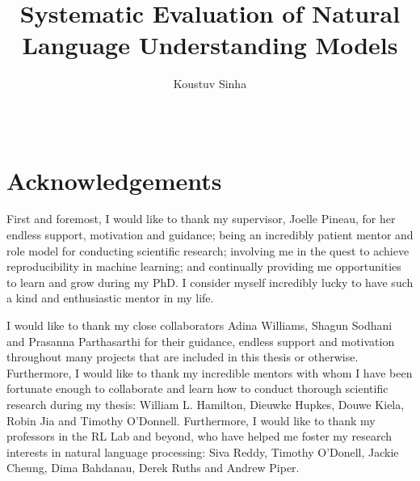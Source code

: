 \documentclass[letterpaper, 12pt]{report}
\begin{document}

\title{Systematic Evaluation of Natural Language Understanding Models}
\author{Koustuv Sinha}
\date{\Month\ \number\year}

\maketitle
\raggedbottom
{}%
{}

\chapter*{Acknowledgements}
\label{chap:ack}

First and foremost, I would like to thank my supervisor, Joelle Pineau, for her endless support, motivation and guidance; being an incredibly patient mentor and role model for conducting scientific research; involving me in the quest to achieve reproducibility in machine learning; and continually providing me opportunities to learn and grow during my PhD. I consider myself incredibly lucky to have such a kind and enthusiastic mentor in my life.

I would like to thank my close collaborators Adina Williams, Shagun Sodhani and Prasanna Parthasarthi for their guidance, endless support and motivation throughout many projects that are included in this thesis or otherwise. Furthermore, I would like to thank my incredible mentors with whom I have been fortunate enough to collaborate and learn how to conduct thorough scientific research during my thesis: William L. Hamilton, Dieuwke Hupkes, Douwe Kiela, Robin Jia and Timothy O'Donnell. Furthermore, I would like to thank my professors in the RL Lab and beyond, who have helped me foster my research interests in natural language processing: Siva Reddy, Timothy O'Donell, Jackie Cheung, Dima Bahdanau, Derek Ruths and Andrew Piper.
\end{document}
